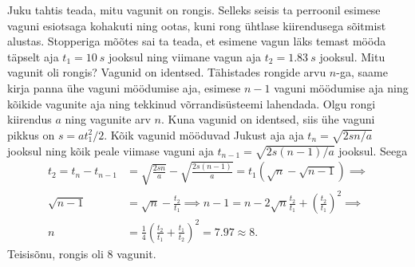 
Juku tahtis teada, mitu vagunit on rongis. Selleks seisis ta perroonil esimese vaguni esiotsaga kohakuti ning ootas, kuni rong ühtlase kiirendusega sõitmist alustas.
Stopperiga mõõtes sai ta teada, et esimene vagun läks temast mööda täpselt aja $t_1=\SI{10}{s}$ jooksul ning viimane vagun aja  $t_2 = \SI{1.83}{s}$ jooksul. Mitu vagunit oli rongis?
Vagunid on identsed.\hint
Tähistades rongide arvu $n$-ga, saame kirja panna ühe vaguni möödumise aja, esimese $n-1$ vaguni möödumise aja ning kõikide vagunite aja ning tekkinud võrrandisüsteemi lahendada.\solu
Olgu rongi kiirendus $a$ ning vagunite arv $n$. Kuna vagunid on identsed, siis ühe vaguni pikkus on $s=at_1^2/2$. Kõik vagunid mööduvad Jukust aja 
aja $t_n=\sqrt{2sn/a}$ jooksul ning kõik peale viimase vaguni aja $t_{n-1}=\sqrt{2s(n-1)/a}$ jooksul. Seega 
\begin{align*}
  t_2=t_n-t_{n-1}&=\sqrt{\frac{2sn}{a}}-\sqrt{\frac{2s(n-1)}{a}}=t_1(\sqrt{n}-\sqrt{n-1})\implies\\
  \sqrt{n - 1} &= \sqrt{n} - \frac{t_2}{t_1} \implies n - 1 = n - 2\sqrt{n}\frac{t_2}{t_1} + \left(\frac{t_2}{t_1}\right)^2 \implies\\
  n &= \frac{1}{4}\left(\frac{t_2}{t_1} + \frac{t_1}{t_2}\right)^2 = 7.97 \approx 8.
\end{align*}
Teisisõnu, rongis oli 8 vagunit.\probend